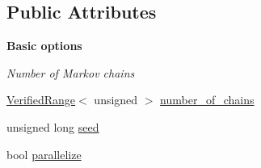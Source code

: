 \subsection*{Public Attributes}
\begin{Indent}{\bf Basic options}\par
{\em \label{_amgrp0f569f5975208cc475c7bb42ee13b9a5}
 Number of Markov chains }\begin{DoxyCompactItemize}
\item 
\hyperlink{classeos_1_1VerifiedRange}{VerifiedRange}$<$ unsigned $>$ \hyperlink{classeos_1_1MarkovChainSampler_1_1Config_a802b6d235de40517746b7fc4147d8c7b}{number\_\-of\_\-chains}
\item 
unsigned long \hyperlink{classeos_1_1MarkovChainSampler_1_1Config_ad969cd46104eb385033df4574079dc57}{seed}
\item 
bool \hyperlink{classeos_1_1MarkovChainSampler_1_1Config_ad66eb9a48dd6aa736cf476322ed5b13e}{parallelize}
\end{DoxyCompactItemize}
\end{Indent}
